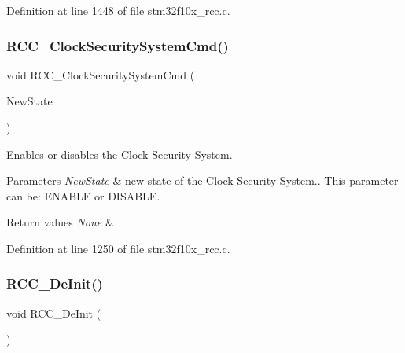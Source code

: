 Definition at line 1448 of file stm32f10x\+\_\+rcc.\+c.

\mbox{\label{group___r_c_c___exported___functions_ga0ff1fd7b9a8a49cdda11b7d7261c3494}} 
\subsubsection{\texorpdfstring{R\+C\+C\+\_\+\+Clock\+Security\+System\+Cmd()}{RCC\_ClockSecuritySystemCmd()}}
{\footnotesize\ttfamily void R\+C\+C\+\_\+\+Clock\+Security\+System\+Cmd (\begin{DoxyParamCaption}\item[{\hyperlink{group___exported__types_gac9a7e9a35d2513ec15c3b537aaa4fba1}{Functional\+State}}]{New\+State }\end{DoxyParamCaption})}



Enables or disables the Clock Security System. 


\begin{DoxyParams}{Parameters}
{\em New\+State} & new state of the Clock Security System.. This parameter can be\+: E\+N\+A\+B\+LE or D\+I\+S\+A\+B\+LE. \\
\hline
\end{DoxyParams}

\begin{DoxyRetVals}{Return values}
{\em None} & \\
\hline
\end{DoxyRetVals}


Definition at line 1250 of file stm32f10x\+\_\+rcc.\+c.

\mbox{\label{group___r_c_c___exported___functions_ga413f6422be11b1334abe60b3bff2e062}} 
\subsubsection{\texorpdfstring{R\+C\+C\+\_\+\+De\+Init()}{RCC\_DeInit()}}
{\footnotesize\ttfamily void R\+C\+C\+\_\+\+De\+Init (\begin{DoxyParamCaption}\item[{void}]{ }\end{DoxyParamCaption})}




